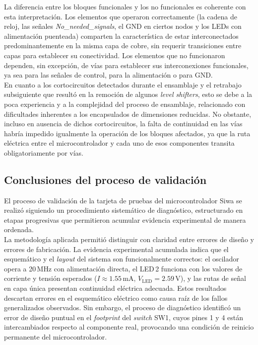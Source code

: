 \documentclass[journal,trans]{IEEEtran}
\begin{document}
La diferencia entre los bloques funcionales y los no funcionales es coherente con esta
interpretación. Los elementos que operaron correctamente (la cadena de reloj, las
señales \textit{No\_needed\_signals}, el GND en ciertos nodos y los LEDs con alimentación
puenteada) comparten la característica de estar interconectados predominantemente en la
misma capa de cobre, sin requerir transiciones entre capas para establecer su
conectividad. Los elementos que no funcionaron dependen, sin excepción, de vías para
establecer sus interconexiones funcionales, ya sea para las señales de control, para la
alimentación o para GND.\\

En cuanto a los cortocircuitos detectados durante el ensamblaje y el retrabajo
subsiguiente que resultó en la remoción de algunos \textit{level shifters}, esto se debe 
a la poca experiencia y a la complejidad del proceso de
ensamblaje, relacionado con dificultades inherentes a los encapsulados de
dimensiones reducidas. No obstante, incluso en ausencia de dichos cortocircuitos, la
falta de continuidad en las vías habría impedido igualmente la operación de los bloques
afectados, ya que la ruta eléctrica entre el microcontrolador y cada uno de esos
componentes transita obligatoriamente por vías.

\subsection{Conclusiones del proceso de validación}

El proceso de validación de la tarjeta de pruebas del microcontrolador Siwa se realizó
siguiendo un procedimiento sistemático de diagnóstico, estructurado en etapas progresivas
que permitieron acumular evidencia experimental de manera ordenada.\\

La metodología aplicada permitió distinguir con claridad entre errores de diseño y errores
de fabricación. La evidencia experimental acumulada indica que el esquemático y el
\textit{layout} del sistema son funcionalmente correctos: el oscilador opera a 20\,MHz con
alimentación directa, el LED\,2 funciona con los valores de corriente y tensión esperados
($I \approx 1.55\,\text{mA}$, $V_\text{LED} = 2.59\,\text{V}$), y las rutas de señal en
capa única presentan continuidad eléctrica adecuada. Estos resultados descartan errores en el 
esquemático eléctrico como causa raíz de los fallos generalizados observados. Sin embargo, 
el proceso de diagnóstico identificó un error de diseño puntual en el \textit{footprint} 
del \textit{switch} SW1, cuyos pines 1 y 4 están intercambiados respecto al componente real, 
provocando una condición de reinicio permanente del microcontrolador.\\
\end{document}
